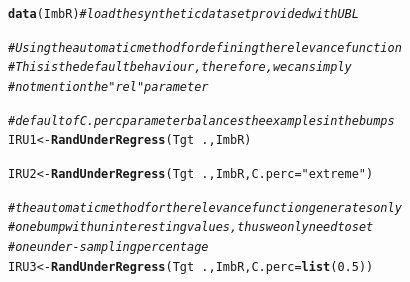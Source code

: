 \documentclass[10pt,a4paper]{article}\usepackage[]{graphicx}\usepackage[]{color}
\makeatletter
\newcommand{\hlnum}[1]{\textcolor[rgb]{0.686,0.059,0.569}{#1}}%
\newcommand{\hlstr}[1]{\textcolor[rgb]{0.192,0.494,0.8}{#1}}%
\newcommand{\hlcom}[1]{\textcolor[rgb]{0.678,0.584,0.686}{\textit{#1}}}%
\newcommand{\hlopt}[1]{\textcolor[rgb]{0,0,0}{#1}}%
\newcommand{\hlstd}[1]{\textcolor[rgb]{0.345,0.345,0.345}{#1}}%
\newcommand{\hlkwb}[1]{\textcolor[rgb]{0.69,0.353,0.396}{#1}}%
\newcommand{\hlkwc}[1]{\textcolor[rgb]{0.333,0.667,0.333}{#1}}%
\newcommand{\hlkwd}[1]{\textcolor[rgb]{0.737,0.353,0.396}{\textbf{#1}}}%
\newenvironment{kframe}{%
 \def\at@end@of@kframe{}%
 \ifinner\ifhmode%
  \def\at@end@of@kframe{\end{minipage}}%
  \begin{minipage}{\columnwidth}%
 \fi\fi%
 \def\FrameCommand##1{\hskip\@totalleftmargin \hskip-\fboxsep
 \colorbox{shadecolor}{##1}\hskip-\fboxsep
     \hskip-\linewidth \hskip-\@totalleftmargin \hskip\columnwidth}%
 \MakeFramed {\advance\hsize-\width
   \@totalleftmargin\z@ \linewidth\hsize
   \@setminipage}}%
 {\par\unskip\endMakeFramed%
 \at@end@of@kframe}
\newenvironment{knitrout}{}{} %
\makeatother
\begin{document}
\begin{knitrout}\footnotesize
{}\color{fgcolor}\begin{kframe}
\begin{alltt}
\hlkwd{data}\hlstd{(ImbR)} \hlcom{# load the synthetic data set provided with UBL}

\hlcom{# Using the automatic method for defining the relevance function}
\hlcom{# This is the default behaviour, therefore, we can simply }
\hlcom{# not mention the "rel" parameter}

\hlcom{# default of C.perc parameter balances the examples in the bumps}
\hlstd{IRU1} \hlkwb{<-} \hlkwd{RandUnderRegress}\hlstd{(Tgt}\hlopt{~}\hlstd{., ImbR)}

\hlstd{IRU2} \hlkwb{<-} \hlkwd{RandUnderRegress}\hlstd{(Tgt}\hlopt{~}\hlstd{., ImbR,} \hlkwc{C.perc} \hlstd{=} \hlstr{"extreme"}\hlstd{)}

\hlcom{# the automatic method for the relevance function generates only }
\hlcom{# one bump with uninteresting values, thus we only need to set }
\hlcom{# one under-sampling percentage}
\hlstd{IRU3} \hlkwb{<-} \hlkwd{RandUnderRegress}\hlstd{(Tgt}\hlopt{~}\hlstd{., ImbR,} \hlkwc{C.perc} \hlstd{=} \hlkwd{list}\hlstd{(}\hlnum{0.5}\hlstd{))}
\end{alltt}
\end{kframe}
\end{knitrout}
\end{document}
